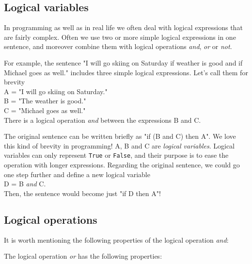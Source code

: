 \subsection{Logical variables}

In programming as well as in real life we often deal with logical expressions that are 
fairly complex. Often we use two or more simple logical expressions in one sentence, 
and moreover combine them with logical operations {\em and}, {\em or} or {\em not}.

For example, the sentence "I will go skiing on Saturday if weather is good and if 
Michael goes as well." includes three simple logical expressions. Let's call 
them for brevity\\

\noindent
A = "I will go skiing on Saturday."\\
B = "The weather is good."\\
C = "Michael goes as well."\\

\noindent
There is a logical operation {\em and} between the expressions B and C.

The original sentence can be written briefly as "if (B and C) then A". We love this kind of 
brevity in programming! A, B and C are {\em logical variables}. Logical variables 
can only represent {\tt True} or {\tt False}, and their purpose is to ease the operation with 
longer expressions.
Regarding the original sentence, we could go one step further and define a new logical variable\\

\noindent
D = B {\em and} C.\\

\noindent
Then, the sentence would become just "if D then A"! 

\subsection{Logical operations}

It is worth mentioning the following properties of the logical operation {\em and}:\\

\begin{center}
\end{center}
\vspace{4mm}
\noindent
The logical operation {\em or} has the following properties:\\

